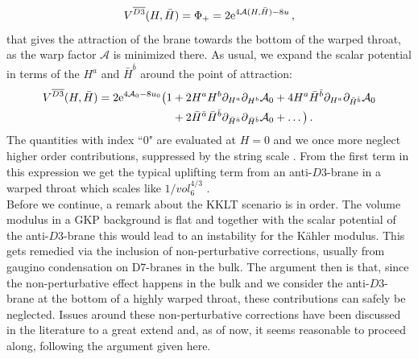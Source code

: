\documentclass[a4paper,12pt,twoside,openright]{report}
\newcommand{\be}{\begin{equation}}
\newcommand{\ee}{\end{equation}}
\newcommand{\bea}{\begin{equation}\begin{aligned}}
\newcommand{\eea}{\end{aligned}\end{equation}}
\def\rme{{\rm e}}
\begin{document}
\be 
V^{\overline{D3}}(H,\bar{H}) = \Phi_+ = 2 \rme^{4\mathcal{A}(H,\bar{H})-8u}\,,
\label{eq:barD3scalpotorig}
\ee
that gives the attraction of the brane towards the bottom of the warped throat, as the warp factor $\mathcal{A}$ is minimized there. As usual, we expand the scalar potential in terms of the $H^a$ and $\bar{H}^{\bar{b}}$ around the point of attraction:
\bea 
V^{\overline{D3}}(H,\bar{H}) = 2 \rme^{4 \mathcal{A}_0-8u_0} \big( 1 &+ 2 H^a H^b \partial_{H^a} \partial_{H^b} \mathcal{A}_0 + 4 H^a \bar{H}^{\bar{b}} \partial_{H^a} \partial_{\bar{H}^{\bar{b}}} \mathcal{A}_0  \\&+ 2 \bar{H}^{\bar{a}} \bar{H}^{\bar{b}} \partial_{\bar{H}^{\bar{a}}} \partial_{\bar{H}^{\bar{b}}} \mathcal{A}_0 + \ldots \big)\,.
\eea
The quantities with index ``$0$" are evaluated at $H=0$ and we once more neglect higher order contributions, suppressed by the string scale \cite{McGuirk:2012sb}. From the first term in this expression we get the typical uplifting term from an anti-$D3$-brane in a warped throat which scales like $1/vol_6^{4/3}$ \cite{Kachru:2003sx}.\\
Before we continue, a remark about the KKLT scenario is in order. The volume modulus in a GKP background is flat and together with the scalar potential of the anti-$D3$-brane this would lead to an instability for the Kähler modulus. This gets remedied via the inclusion of non-perturbative corrections, usually from gaugino condensation on D7-branes in the bulk. The argument then is that, since the non-perturbative effect happens in the bulk and we consider the anti-$D3$-brane at the bottom of a highly warped throat, these contributions can safely be neglected. Issues around these non-perturbative corrections have been discussed in the literature to a great extend \cite{Moritz:2017xto,Moritz:2018sui,Kallosh:2018wme,Moritz:2018ani,Kallosh:2018psh,Gautason:2018gln,Hamada:2018qef,Kallosh:2019axr,Kallosh:2019oxv,Hamada:2019ack,Carta:2019rhx,Gautason:2019jwq,Kachru:2019dvo} and, as of now, it seems reasonable to proceed along, following the argument given here.
\end{document}
